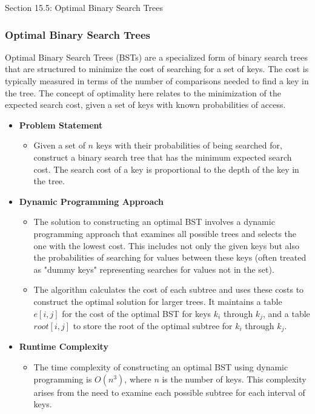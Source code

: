 \begin{notes}{Section 15.5: Optimal Binary Search Trees}
    \subsubsection*{Optimal Binary Search Trees}

    Optimal Binary Search Trees (BSTs) are a specialized form of binary search trees that are structured to minimize the cost of searching for a set of keys. The cost is typically measured in terms of 
    the number of comparisons needed to find a key in the tree. The concept of optimality here relates to the minimization of the expected search cost, given a set of keys with known probabilities of access.
    
    \begin{itemize}
        \item \textbf{Problem Statement}
        \begin{itemize}
            \item Given a set of $n$ keys with their probabilities of being searched for, construct a binary search tree that has the minimum expected search cost. The search cost of a key is proportional 
            to the depth of the key in the tree.
        \end{itemize}
        
        \item \textbf{Dynamic Programming Approach}
        \begin{itemize}
            \item The solution to constructing an optimal BST involves a dynamic programming approach that examines all possible trees and selects the one with the lowest cost. This includes not only 
            the given keys but also the probabilities of searching for values between these keys (often treated as "dummy keys" representing searches for values not in the set).
            \item The algorithm calculates the cost of each subtree and uses these costs to construct the optimal solution for larger trees. It maintains a table $e[i,j]$ for the cost of the optimal 
            BST for keys $k_i$ through $k_j$, and a table $root[i,j]$ to store the root of the optimal subtree for $k_i$ through $k_j$.
        \end{itemize}
        
        \item \textbf{Runtime Complexity}
        \begin{itemize}
            \item The time complexity of constructing an optimal BST using dynamic programming is $O(n^3)$, where $n$ is the number of keys. This complexity arises from the need to examine each possible 
            subtree for each interval of keys.
        \end{itemize}
    \end{itemize}
    

\end{notes}
